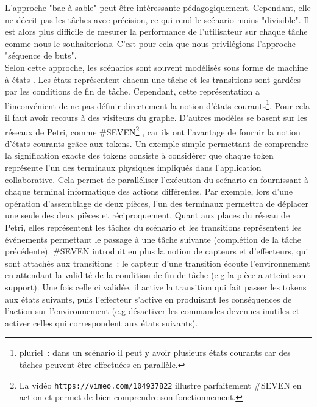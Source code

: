 \documentclass[11pt]{article}
\begin{document}
L'approche "bac à sable" peut être intéressante pédagogiquement. Cependant, elle ne décrit pas les tâches avec précision, ce qui rend le scénario moins "divisible". Il est alors plus difficile de mesurer la performance de l'utilisateur sur chaque tâche comme nous le souhaiterions. C'est pour cela que nous privilégions l'approche "séquence de buts".
\\

Selon cette approche, les scénarios sont souvent modélisés sous forme de machine à états \cite{state-machine}. Les états représentent chacun une tâche et les transitions sont gardées par les conditions de fin de tâche. Cependant, cette représentation a l'inconvénient de ne pas définir directement la notion d'états courants\footnote{pluriel~: dans un scénario il peut y avoir plusieurs états courants car des tâches peuvent être effectuées en parallèle.}. Pour cela il faut avoir recours à des visiteurs du graphe. D'autres modèles se basent sur les réseaux de Petri, comme \#SEVEN\footnote{La vidéo \texttt{https://vimeo.com/104937822} illustre parfaitement \#SEVEN en action et permet de bien comprendre son fonctionnement.} \cite{seven}, car ils ont l'avantage de fournir la notion d'états courants grâce aux tokens. Un exemple simple permettant de comprendre la signification exacte des tokens consiste à considérer que chaque token représente l'un des terminaux physiques impliqués dans l'application collaborative. Cela permet de paralléliser l'exécution du scénario en fournissant à chaque terminal informatique des actions différentes. Par exemple, lors d'une opération d'assemblage de deux pièces, l'un des terminaux permettra de déplacer une seule des deux pièces et réciproquement. Quant aux places du réseau de Petri, elles représentent les tâches du scénario et les transitions représentent les événements permettant le passage à une tâche suivante (complétion de la tâche précédente). \#SEVEN introduit en plus la notion de capteurs et d'effecteurs, qui sont attachés aux transitions~: le capteur d'une transition écoute l'environnement en attendant la validité de la condition de fin de tâche (e.g la pièce a atteint son support). Une fois celle ci validée, il active la transition qui fait passer les tokens aux états suivants, puis l'effecteur s'active en produisant les conséquences de l'action sur l'environnement (e.g désactiver les commandes devenues inutiles et activer celles qui correspondent aux états suivants).
\\
\end{document}
